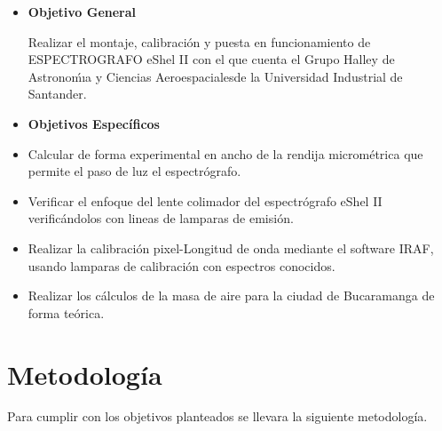 \documentclass[11pt]{article}
\begin{document}

\begin{itemize}
\item \textbf{Objetivo General}

Realizar el montaje, calibración y puesta en funcionamiento de ESPECTROGRAFO eShel II con el que cuenta el Grupo Halley de Astronoḿıa y Ciencias Aeroespacialesde la Universidad Industrial de Santander.\\

\item \textbf{Objetivos Espec\'ificos}
\end{itemize}

\begin{itemize}

\item Calcular de forma experimental en ancho de la rendija micrométrica que permite el paso de luz el espectrógrafo.

\item Verificar el enfoque del lente colimador del espectrógrafo eShel II verificándolos con lineas de lamparas de emisión.

\item Realizar la calibración pixel-Longitud de onda mediante el software IRAF, usando lamparas de calibración con espectros conocidos.

\item Realizar los cálculos de la masa de aire para la ciudad de Bucaramanga de forma teórica.

\end{itemize}




\newpage

\section{Metodolog\'ia}

Para cumplir con los objetivos planteados se llevara la siguiente metodología.
\end{document}
